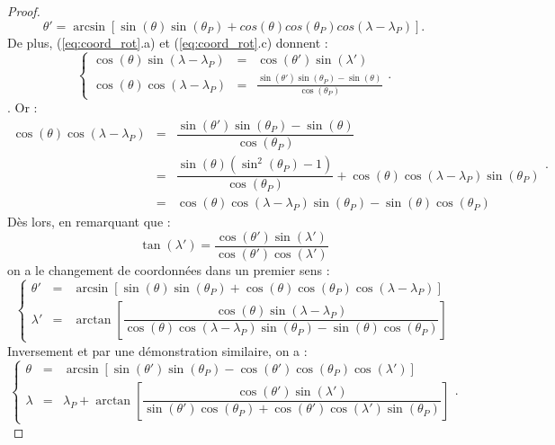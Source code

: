 \begin{proof}
\begin{equation}
\theta' = \arcsin \left[ \sin( \theta) \sin(\theta_P) + cos( \theta ) cos( \theta_P) cos( \lambda - \lambda_P ) \right] .
\end{equation}
De plus, (\ref{eq:coord_rot}.a) et (\ref{eq:coord_rot}.c) donnent :
\begin{equation}
\left\lbrace 
\begin{array}{rcl}
\cos( \theta ) \sin( \lambda - \lambda_P) & = & \cos( \theta' ) \sin( \lambda' ) \\
\cos( \theta ) \cos( \lambda - \lambda_P) & = & \frac{\sin( \theta' ) \sin ( \theta_P ) - \sin( \theta )}{\cos( \theta_P)}
\end{array}
\right. .
\end{equation}.
Or :
\begin{equation*}
\begin{array}{rcl}
\cos( \theta ) \cos( \lambda - \lambda_P) & = & \dfrac{\sin( \theta' ) \sin ( \theta_P ) - \sin( \theta )}{\cos( \theta_P)} \\
 & = & \dfrac{\sin( \theta) (\sin^2 ( \theta_P) -1 )}{\cos( \theta_P)} + \cos( \theta ) \cos( \lambda- \lambda_P) \sin( \theta_P)\\
 & = & \cos ( \theta) \cos( \lambda - \lambda_P) \sin( \theta_P ) - \sin( \theta) \cos ( \theta_P )
\end{array} .
\end{equation*}
Dès lors, en remarquant que :
\begin{equation}
\tan ( \lambda' ) =  \dfrac{\cos( \theta' ) \sin(  \lambda' ) }{\cos( \theta' ) \cos(  \lambda' )}
\end{equation}
on a le changement de coordonnées dans un premier sens :
\begin{equation}
\left\lbrace 
\begin{array}{rcl}
\theta' & = & \arcsin \left[ \sin( \theta) \sin(\theta_P) + \cos( \theta ) \cos( \theta_P) \cos( \lambda - \lambda_P ) \right] \\
\lambda' & = & \arctan \left[ \dfrac{\cos ( \theta) \sin( \lambda - \lambda_P)}{\cos( \theta) \cos( \lambda - \lambda_P) \sin( \theta_P) - \sin( \theta) \cos( \theta_P)} \right]
\end{array}
\right.
\end{equation}
Inversement et par une démonstration similaire, on a :
\begin{equation}
\left\lbrace 
\begin{array}{rcl}
\theta & = & \arcsin \left[ \sin( \theta') \sin(\theta_P) - \cos( \theta' ) \cos( \theta_P) \cos( \lambda' ) \right] \\
\lambda & = & \lambda_P + \arctan \left[ \dfrac{\cos ( \theta') \sin( \lambda ')}{\sin( \theta') \cos( \theta_P) + \cos ( \theta') \cos( \lambda') \sin ( \theta_P)} \right]
\end{array}
\right. .
\end{equation}
\end{proof}

